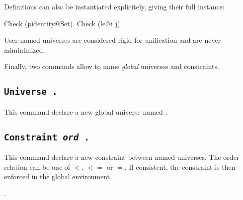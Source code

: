 Definitions can also be instantiated explicitely, giving their full instance:
\begin{coq_example}
Check (pidentity@{Set}).
Check (le@{i j}).
\end{coq_example}

User-named universes are considered rigid for unification and are never
miminimized.

Finally, two commands allow to name \emph{global} universes and constraints.

\subsection{\tt Universe {\ident}.
  \label{UniverseCmd}}

This command declare a new global universe named {\ident}.

\subsection{\tt Constraint {\ident} {\textit{ord}} {\ident}.
  \label{ConstraintCmd}}

This command declare a new constraint between named universes. 
The order relation can be one of $<$, $<=$ or $=$. If consistent, 
the constraint is then enforced in the global environment.

\begin{ErrMsgs}
\item {}.
\item {}
\end{ErrMsgs}

